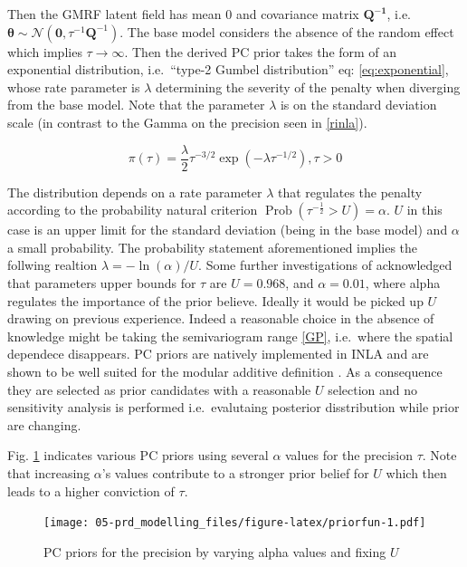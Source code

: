 \documentclass[
  12pt,
  a4paper,
  oneside]{book}
\theoremstyle{definition}
\theoremstyle{definition}
\theoremstyle{definition}
\theoremstyle{remark}
\begin{document}
Then the GMRF latent field has mean 0 and covariance matrix \(\boldsymbol{Q^{-1}}\), i.e.~\(\boldsymbol{\theta} \sim \mathcal{N}\left(\mathbf{0}, \tau^{-1} \boldsymbol{Q}^{-1}\right)\). The base model considers the absence of the random effect which implies \(\tau \rightarrow \infty\). Then the derived PC prior \citep{simpson2017} takes the form of an exponential distribution, i.e.~``type-2 Gumbel distribution'' eq: \eqref{eq:exponential}, whose rate parameter is \(\lambda\) determining the severity of the penalty when diverging from the base model. Note that the parameter \(\lambda\) is on the standard deviation scale (in contrast to the Gamma on the precision seen in \ref{rinla}).

\begin{equation}
  \pi(\tau)=\frac{\lambda}{2} \tau^{-3 / 2} \exp \left(-\lambda \tau^{-1 / 2}\right), \tau>0
\label{eq:exponential}
\end{equation}

The distribution depends on a rate parameter \(\lambda\) that regulates the penalty according to the probability natural criterion \citep{slides} \(\operatorname{Prob}(\tau^{-\frac{1}{2}} > U)=\alpha\). \(U\) in this case is an upper limit for the standard deviation (being in the base model) and \(\alpha\) a small probability. The probability statement aforementioned implies the follwing realtion \(\lambda=-\ln (\alpha) / U\). Some further investigations of \citet{simpson2017} acknowledged that parameters upper bounds for \(\tau\) are \(U = 0.968\), and \(\alpha = 0.01\), where alpha regulates the importance of the prior believe. Ideally it would be picked up \(U\) drawing on previous experience. Indeed a reasonable choice in the absence of knowledge might be taking the semivariogram range \ref{GP}, i.e.~where the spatial dependece disappears.
PC priors are natively implemented in INLA and are shown to be well suited for the modular additive definition \citep{Bayesian_INLA_Rubio}. As a consequence they are selected as prior candidates with a reasonable \(U\) selection and no sensitivity analysis is performed i.e.~evalutaing posterior disstribution while prior are changing.

Fig. \ref{fig:priorfun} indicates various PC priors using several \(\alpha\) values for the precision \(\tau\). Note that increasing \(\alpha\)'s values contribute to a stronger prior belief for \(U\) which then leads to a higher conviction of \(\tau\).

\begin{figure}
\centering
\texttt{[image: 05-prd\_modelling\_files/figure-latex/priorfun-1.pdf]}
\caption{\label{fig:priorfun}PC priors for the precision by varying alpha values and fixing \(U\)}
\end{figure}
\end{document}
